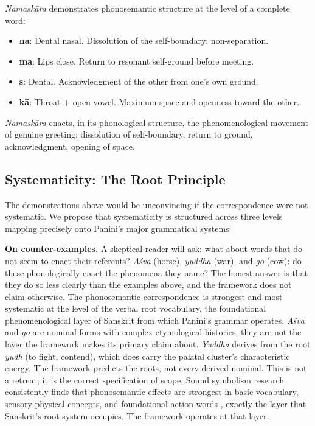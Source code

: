 \documentclass[12pt]{article}
\begin{document}
\textit{Namask\={a}ra} demonstrates phonosemantic structure at the level of a complete word:

\begin{itemize}[leftmargin=2em]
  \item \textbf{na}: Dental nasal. Dissolution of the self-boundary; non-separation.
  \item \textbf{ma}: Lips close. Return to resonant self-ground before meeting.
  \item \textbf{s}: Dental. Acknowledgment of the other from one's own ground.
  \item \textbf{k\={a}}: Throat + open vowel. Maximum space and openness toward the other.
\end{itemize}

\textit{Namask\={a}ra} enacts, in its phonological structure, the phenomenological movement of genuine greeting: dissolution of self-boundary, return to ground, acknowledgment, opening of space.

\subsection{Systematicity: The Root Principle}

The demonstrations above would be unconvincing if the correspondence were not systematic. We propose that systematicity is structured across three levels mapping precisely onto Panini's major grammatical systems:

\textbf{On counter-examples.} A skeptical reader will ask: what about words that do not seem to enact their referents? \textit{A{\'{s}}va} (horse), \textit{yuddha} (war), and \textit{go} (cow): do these phonologically enact the phenomena they name? The honest answer is that they do so less clearly than the examples above, and the framework does not claim otherwise. The phonosemantic correspondence is strongest and most systematic at the level of the verbal root vocabulary, the foundational phenomenological layer of Sanskrit from which Panini's grammar operates. \textit{A{\'{s}}va} and \textit{go} are nominal forms with complex etymological histories; they are not the layer the framework makes its primary claim about. \textit{Yuddha} derives from the root \textit{yudh} (to fight, contend), which does carry the palatal cluster's characteristic energy. The framework predicts the roots, not every derived nominal. This is not a retreat; it is the correct specification of scope. Sound symbolism research consistently finds that phonosemantic effects are strongest in basic vocabulary, sensory-physical concepts, and foundational action words \cite{blasi2016, sidhu2025}, exactly the layer that Sanskrit's root system occupies. The framework operates at that layer.
\end{document}
